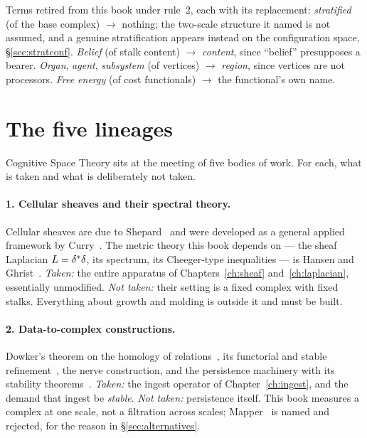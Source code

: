 \begin{hon}\Hon
Terms retired from this book under rule~2, each with its replacement:
\emph{stratified} (of the base complex) $\to$ nothing; the two-scale structure
it named is not assumed, and a genuine stratification appears instead on the
configuration space, \S\ref{sec:stratconf}. \emph{Belief} (of stalk content)
$\to$ \emph{content}, since ``belief'' presupposes a bearer. \emph{Organ},
\emph{agent}, \emph{subsystem} (of vertices) $\to$ \emph{region}, since
vertices are not processors. \emph{Free energy} (of cost functionals) $\to$
the functional's own name.
\end{hon}

\section{The five lineages}

Cognitive Space Theory sits at the meeting of five bodies of work. For each,
what is taken and what is deliberately not taken.

\paragraph{1. Cellular sheaves and their spectral theory.}
Cellular sheaves are due to Shepard~\cite{Shepard} and were developed as a
general applied framework by Curry~\cite{Curry}. The metric theory this book
depends on --- the sheaf Laplacian $L=\delta^{\ast}\delta$, its spectrum, its
Cheeger-type inequalities --- is Hansen and Ghrist~\cite{HansenGhrist}.
\emph{Taken:} the entire apparatus of Chapters~\ref{ch:sheaf}
and~\ref{ch:laplacian}, essentially unmodified. \emph{Not taken:} their
setting is a fixed complex with fixed stalks. Everything about growth and
molding is outside it and must be built.

\paragraph{2. Data-to-complex constructions.}
Dowker's theorem on the homology of relations~\cite{Dowker}, its functorial
and stable refinement~\cite{ChowdhuryMemoli}, the nerve construction, and the
persistence machinery with its stability
theorems~\cite{CEH,ChazalStructure,Carlsson}. \emph{Taken:} the ingest
operator of Chapter~\ref{ch:ingest}, and the demand that ingest be
\emph{stable}. \emph{Not taken:} persistence itself. This book measures a
complex at one scale, not a filtration across scales; Mapper~\cite{SinghMemoliCarlsson}
is named and rejected, for the reason in \S\ref{sec:alternatives}.

